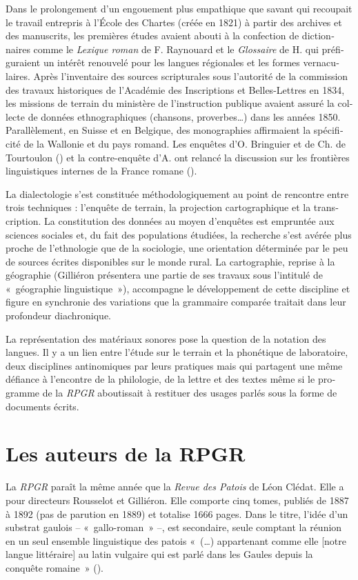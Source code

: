 \documentclass[french,output=paper,colorlinks,citecolor=brown]{../langscibook}
\begin{document}
\begin{otherlanguage}{french}
 Dans le prolongement d’un engouement plus empathique que savant qui recoupait le travail entrepris à l’École des Chartes (créée en 1821) à partir des archives et des manuscrits, les premières études avaient abouti à la confection de dictionnaires comme le \textit{Lexique roman} \citeyear{Raynouard1838} de F. Raynouard et le \textit{Glossaire} de H. \citet{Jaubert1856} qui préfiguraient un intérêt renouvelé pour les langues régionales et les formes vernaculaires. Après l’inventaire des sources scripturales sous l’autorité de la commission des travaux historiques de l’Académie des Inscriptions et Belles-Lettres en 1834, les missions de terrain du ministère de l’instruction publique avaient assuré la collecte de données ethnographiques (chansons, proverbes…) dans les années 1850. Parallèlement, en Suisse et en Belgique, des monographies affirmaient la spécificité de la Wallonie et du pays romand. Les enquêtes d’O. Bringuier et de Ch. de Tourtoulon (\citeyear{TourtoulonBringuier1876}) et la contre-enquête d’A. \citet{Thomas1879} ont relancé la discussion sur les frontières linguistiques internes de la France romane (\citealt{Brun-Trigaud1990}).

La dialectologie s’est constituée méthodologiquement au point de rencontre entre trois techniques : l’enquête de terrain, la projection cartographique et la transcription. La constitution des données au moyen d’enquêtes est empruntée aux sciences sociales et, du fait des populations étudiées, la recherche s’est avérée plus proche de l’ethnologie que de la sociologie, une orientation déterminée par le peu de sources écrites disponibles sur le monde rural. La cartographie, reprise à la géographie (Gilliéron présentera une partie de ses travaux sous l’intitulé de «~géographie linguistique~»), accompagne le développement de cette discipline et figure en synchronie des variations que la grammaire comparée traitait dans leur profondeur diachronique. 

La représentation des matériaux sonores pose la question de la notation des langues. Il y a un lien entre l’étude sur le terrain et la phonétique de laboratoire, deux disciplines antinomiques par leurs pratiques mais qui partagent une même défiance à l’encontre de la philologie, de la lettre et des textes même si le programme de la \textit{RPGR} aboutissait à restituer des usages parlés sous la forme de documents écrits. 

\section{Les auteurs de la RPGR} 
\largerpage
La \textit{RPGR} paraît la même année que la \textit{Revue des Patois} de Léon Clédat. Elle a pour directeurs Rousselot et Gilliéron. Elle comporte cinq tomes, publiés de 1887 à 1892 (pas de parution en 1889) et totalise 1666 pages. Dans le titre, l’idée d’un substrat gaulois – «~gallo-roman~» –, est secondaire, seule comptant la réunion en un seul ensemble linguistique des patois «~(…) appartenant comme elle [notre langue littéraire] au latin vulgaire qui est parlé dans les Gaules depuis la conquête romaine~» (\citealt[1]{Rousselot1887}). 


\end{otherlanguage}
\end{document}
